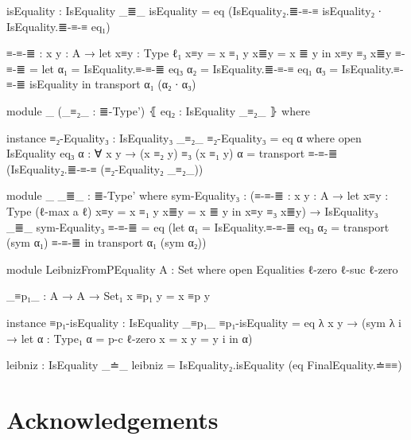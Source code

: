 \documentclass{article}
\begin{document}
\begin{code}
          isEquality : IsEquality _≣_
          isEquality = eq (IsEquality₂.≣-≡-≡ isEquality₂ ∙ IsEquality.≣-≡-≡ eq₁)

        ≡-≡-≣ : {x y : A} → let
          x≡y : Type ℓ₁
          x≡y = x ≡₁ y
          x≣y = x ≣ y
          in x≡y ≡₃ x≣y
        ≡-≡-≣ = let
          α₁ = IsEquality.≡-≡-≣ eq₃
          α₂ = IsEquality.≣-≡-≡ eq₁
          α₃ = IsEquality.≡-≡-≣ isEquality
          in transport α₁ (α₂ ∙ α₃)

      module _
        (_≡₂_ : ≣-Type')
        ⦃ eq₂ : IsEquality _≡₂_ ⦄
        where

        instance
          ≡₂-Equality₃ : IsEquality₃ _≡₂_
          ≡₂-Equality₃ = eq α
            where
              open IsEquality eq₃
              α : ∀ {x y} → (x ≡₂ y) ≡₃ (x ≡₁ y)
              α = transport ≡-≡-≣ (IsEquality₂.≣-≡-≡ (≡₂-Equality₂ _≡₂_))

      module _ {_≣_ : ≣-Type'} where
        sym-Equality₃ : (≡-≡-≣ : {x y : A} → let
          x≡y : Type (ℓ-max a ℓ)
          x≡y = x ≡₁ y
          x≣y = x ≣ y
          in x≡y ≡₃ x≣y)
          → IsEquality₃ _≣_
        sym-Equality₃ ≡-≡-≣ = eq (let
          α₁ = IsEquality.≡-≡-≣ eq₃
          α₂ = transport (sym α₁) ≡-≡-≣
          in transport α₁ (sym α₂))

module LeibnizFromPEquality {A : Set} where
  open Equalities {ℓ-zero} {ℓ-suc ℓ-zero}

  _≡p₁_ : A → A → Set₁
  x ≡p₁ y = x ≡p y

  instance
    ≡p₁-isEquality : IsEquality _≡p₁_
    ≡p₁-isEquality = eq λ {x y} → (sym λ i → let
      α : Type₁
      α = p-c {ℓ-zero} {x = x} {y = y} i
      in α)

  leibniz : IsEquality _≐_
  leibniz =
    IsEquality₂.isEquality (eq FinalEquality.≐≡≡)

\end{code}

\section*{Acknowledgements}



\end{document}
